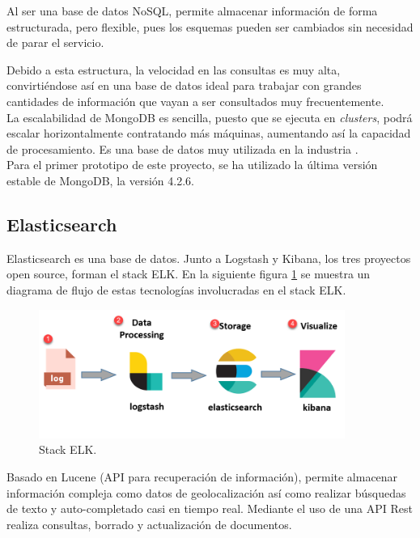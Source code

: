 \documentclass[a4paper, 12pt]{book}
\begin{document}
		Al ser una base de datos NoSQL, permite almacenar información de forma estructurada, pero flexible, pues los esquemas pueden ser cambiados sin necesidad de parar el servicio.
		
		Debido a esta estructura, la velocidad en las consultas es muy alta, convirtiéndose así en una base de datos ideal para trabajar con grandes cantidades de información que vayan a ser consultados muy frecuentemente.\\
		
		La escalabilidad de MongoDB es sencilla, puesto que se ejecuta en \textit{clusters}, podrá escalar horizontalmente contratando más máquinas, aumentando así la capacidad de procesamiento. Es una base de datos muy utilizada en la industria \cite{Use_MongoDB}.\\
		
		Para el primer prototipo de este proyecto, se ha utilizado la última versión estable de MongoDB, la versión 4.2.6.
		
	\subsection{Elasticsearch}
	\label{subsec:elasticsearch}
		Elasticsearch \cite{elasticsearch} es una base de datos. Junto a Logstash y Kibana, los tres proyectos open source, forman el stack ELK. En la siguiente figura \ref{fig:ELK_Stack} se muestra un diagrama de flujo de estas tecnologías involucradas en el stack ELK.\\
		
		\begin{figure}[H]
			\centering
			\includegraphics[width=10cm, keepaspectratio]{img/ELK_Stack.png}
			\caption{Stack ELK.}
			\label{fig:ELK_Stack}
		\end{figure}
		
		Basado en Lucene (API para recuperación de información), permite almacenar información compleja como datos de geolocalización así como realizar búsquedas de texto y auto-completado casi en tiempo real. Mediante el uso de una API Rest realiza consultas, borrado y actualización de documentos.\\
		
\end{document}

